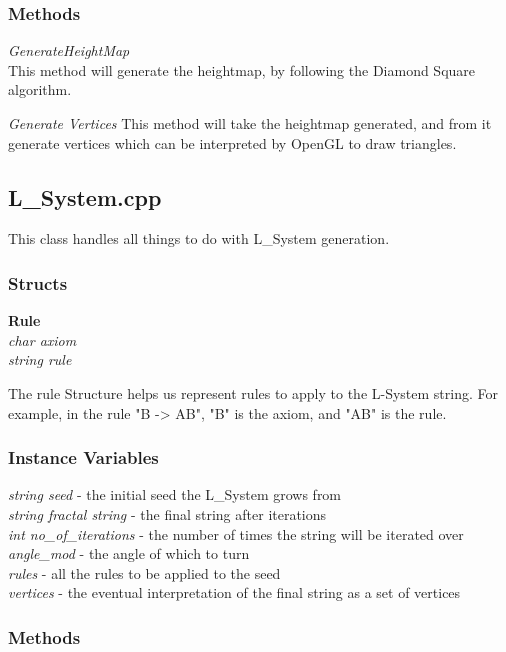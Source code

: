 \documentclass[a4paper,10pt]{report}
\begin{document}
\subsubsection{Methods}

\textit{GenerateHeightMap}\\
This method will generate the heightmap, by following the Diamond Square algorithm. \medskip

\textit{Generate Vertices}
This method will take the heightmap generated, and from it generate vertices which can be interpreted by OpenGL to draw triangles. 

\subsection{L\_System.cpp}
This class handles all things to do with L\_System generation.

\subsubsection{Structs}

\textbf{Rule}\\
\textit{char axiom}\\
\textit{string rule}\medskip

The rule Structure helps us represent rules to apply to the L-System string. For example, in the rule "B -> AB", "B" is the axiom, and "AB" is the rule.

\subsubsection{Instance Variables}
\textit{string seed} - the initial seed the L\_System grows from\\
\textit{string fractal string} - the final string after iterations\\
\textit{int no\_of\_iterations} - the number of times the string will be iterated over\\
\textit{angle\_mod} - the angle of which to turn\\
\textit{rules} - all the rules to be applied to the seed\\
\textit{vertices} - the eventual interpretation of the final string as a set of vertices\\

\subsubsection{Methods}
\end{document}
